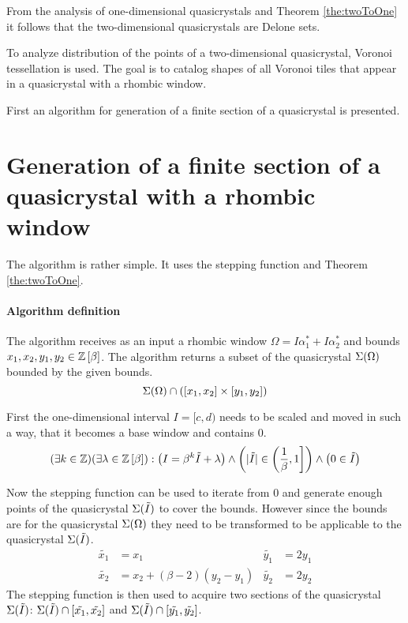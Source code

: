 \documentclass[text.tex]{subfiles}
\begin{document}
From the analysis of one-dimensional quasicrystals and Theorem \ref{the:twoToOne} it follows that the two-dimensional quasicrystals are Delone sets.  

To analyze distribution of the points of a two-dimensional quasicrystal, Voronoi tessellation is used. The goal is to catalog shapes of all Voronoi tiles that appear in a quasicrystal with a rhombic window. 

First an algorithm for generation of a finite section of a quasicrystal is presented. 

%
\clearpage
\section{Generation of a finite section of a quasicrystal with a rhombic window}%
The algorithm is rather simple. It uses the stepping function and Theorem \ref{the:twoToOne}. 

\paragraph{Algorithm definition} The algorithm receives as an input a rhombic window $\Omega = I\alpha_1^\ast + I\alpha_2^\ast$ and bounds $x_1, x_2, y_1, y_2 \in \mathbb{Z}\left[\beta\right]$.
The algorithm returns a subset of the quasicrystal $\Sigma(\Omega)$ bounded by the given bounds.
$$\Sigma(\Omega)\cap([x_1,x_2]\times[y_1,y_2])$$

First the one-dimensional interval $I = [c,d)$ needs to be scaled and moved in such a way, that it becomes a base window and contains $0$.
$$(\exists k\in\mathbb{Z})(\exists \lambda\in\mathbb{Z}\left[\beta\right]) : \left(I = \beta^k\tilde{I}+\lambda\right) \wedge \left(|\tilde{I}| \in \left(\frac{1}{\beta},1\right] \right)\wedge \left(0\in\tilde{I}\right)$$

Now the stepping function can be used to iterate from 0 and generate enough points of the quasicrystal $\Sigma(\tilde{I})$ to cover the bounds. However since the bounds are for the quasicrystal $\Sigma(\Omega)$ they need to be transformed to be applicable to the quasicrystal $\Sigma(\tilde{I})$. 
\begin{align*}
\tilde{x_1} &= x_1 & \tilde{y_1} &= 2y_1 \\
\tilde{x_2} &= x_2 + (\beta-2)(y_2-y_1) & \tilde{y_2} &= 2y_2 
\end{align*}
The stepping function is then used to acquire two sections of the quasicrystal $\Sigma(\tilde{I})$: $\Sigma(\tilde{I})\cap[\tilde{x_1},\tilde{x_2}]$ and $\Sigma(\tilde{I})\cap[\tilde{y_1},\tilde{y_2}]$.
\end{document}
